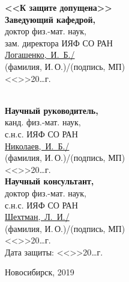 \documentclass[a4paper,11pt]{extreport}
\begin{document}
\noindent
\vspace*{11pt}
\begin{multicols}{2}
	\textbf{<<К защите допущена>>} \\			
	\textbf{Заведующий кафедрой,}\\           			
	доктор физ.-мат. наук,\\   			
	зам. директора ИЯФ СО РАН\\            			
	\underline{Логашенко,~И.~Б./\makebox[3cm]{\dotfill}}\\
	\small{(фамилия, И.\,О.)/(подпись, МП)}\\
	<<\makebox[0.7cm]{\dotfill}>>\makebox[3cm]{\dotfill}20\dots г.\\
\columnbreak

	\phantom{\hspace{1pt}}\\
	\textbf{Научный руководитель,} \\
	канд. физ.-мат. наук, \\
	с.н.с. ИЯФ СО РАН\\
	\underline{Николаев,~И.~Б./\makebox[3cm]{\dotfill}}\\
	\small{(фамилия, И.\,О.)/(подпись, МП)}\\
	<<\makebox[0.7cm]{\dotfill}>>\makebox[3cm]{\dotfill}20\dots г.\\
	\vspace{11pt}
	\textbf{Научный консультант,} \\
	доктор физ.-мат. наук, \\
	с.н.с. ИЯФ СО РАН\\
	\underline{Шехтман,~Л.~И./\makebox[3cm]{\dotfill}}\\
	\small{(фамилия, И.\,О.)/(подпись, МП)}\\
	<<\makebox[0.7cm]{\dotfill}>>\makebox[3cm]{\dotfill}20\dots г.\\
	\vspace{11pt}
	Дата защиты: <<\makebox[0.7cm]{\dotfill}>>\makebox[3cm]{\dotfill}20\dots г.\\
\end{multicols}


\vspace{11pt}


\vfill

\begin{center}
	Новосибирск, 2019
\end{center}
\end{document}
